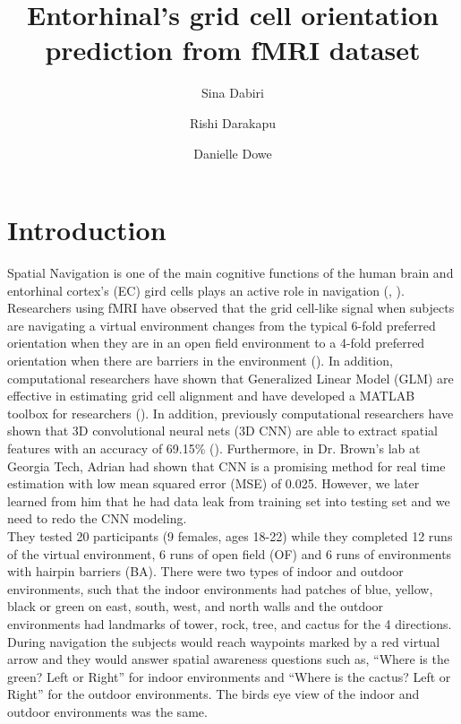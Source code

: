 \documentclass[a4paper]{article}
\title{Entorhinal's grid cell orientation prediction from fMRI dataset}
\author[1]{Sina Dabiri}
\author[2]{Rishi Darakapu}
\author[3]{Danielle Dowe}
\affil[1]{Department of Biomedical Engineering, Georgia Institute of Technology, Atlanta, Georgia}
\affil[2]{Department of Biomedical Engineering, Georgia Institute of Technology, Atlanta, Georgia}
\affil[3]{Department of Machine Learning, Georgia Institute of Technology, Atlanta, Georgia}
\date{} %
\begin{document}
\maketitle

\section{Introduction}
\label{sec:introduction}

Spatial Navigation is one of the main cognitive functions of the human brain and entorhinal cortex’s (EC) gird cells plays an active role in navigation (\cite{hafting_microstructure_2005}, \cite{yartsev_grid_2011}). Researchers using fMRI have observed that the grid cell-like signal when subjects are navigating a virtual environment changes from the typical 6-fold preferred orientation when they are in an open field environment to a 4-fold preferred orientation when there are barriers in the environment (\cite{he_environmental_2019}). In addition, computational researchers have shown that Generalized Linear Model (GLM) are effective in estimating grid cell alignment and have developed a MATLAB toolbox for researchers (\cite{stangl_gridcat_2017}). In addition, previously computational researchers have shown that 3D convolutional neural nets (3D CNN) are able to extract spatial features with an accuracy of 69.15\% (\cite{zou_3d_2017}). Furthermore, in Dr. Brown’s lab at Georgia Tech, Adrian had shown that CNN is a promising method for real time estimation with low mean squared error (MSE) of 0.025. However, we later learned from him that he had data leak from training set into testing set and we need to redo the CNN modeling. \\

 \noindent They tested 20 participants (9 females, ages 18-22) while they completed 12 runs of the virtual environment, 6 runs of open field (OF) and 6 runs of environments with hairpin barriers (BA). There were two types of indoor and outdoor environments, such that the indoor environments had patches of blue, yellow, black or green on east, south, west, and north walls and the outdoor environments had landmarks of tower, rock, tree, and cactus for the 4 directions. During navigation the subjects would reach waypoints marked by a red virtual arrow and they would answer spatial awareness questions such as, “Where is the green? Left or Right” for indoor environments and “Where is the cactus? Left or Right” for the outdoor environments. The birds eye view of the indoor and outdoor environments was the same. \\
\end{document}
